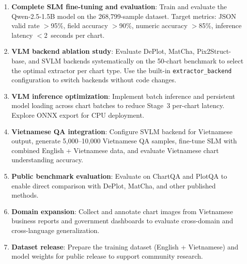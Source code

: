 \begin{enumerate}
    \item \textbf{Complete SLM fine-tuning and evaluation}: Train and evaluate the
          Qwen-2.5-1.5B model on the 268,799-sample dataset. Target metrics: JSON valid
          rate $>$95\%, field accuracy $>$90\%, numeric accuracy $>$85\%, inference
          latency $<$2~seconds per chart.
    \item \textbf{VLM backend ablation study}: Evaluate DePlot, MatCha, Pix2Struct-base,
          and SVLM backends systematically on the 50-chart benchmark to select the
          optimal extractor per chart type. Use the built-in \texttt{extractor\_backend}
          configuration to switch backends without code changes.
    \item \textbf{VLM inference optimization}: Implement batch inference and persistent
          model loading across chart batches to reduce Stage~3 per-chart latency.
          Explore ONNX export for CPU deployment.
    \item \textbf{Vietnamese QA integration}: Configure SVLM backend for Vietnamese
          output, generate 5,000--10,000 Vietnamese QA samples, fine-tune SLM with
          combined English + Vietnamese data, and evaluate Vietnamese chart
          understanding accuracy.
    \item \textbf{Public benchmark evaluation}: Evaluate on ChartQA and PlotQA to enable
          direct comparison with DePlot, MatCha, and other published methods.
    \item \textbf{Domain expansion}: Collect and annotate chart images from Vietnamese
          business reports and government dashboards to evaluate cross-domain and
          cross-language generalization.
    \item \textbf{Dataset release}: Prepare the training dataset (English + Vietnamese)
          and model weights for public release to support community research.
\end{enumerate}